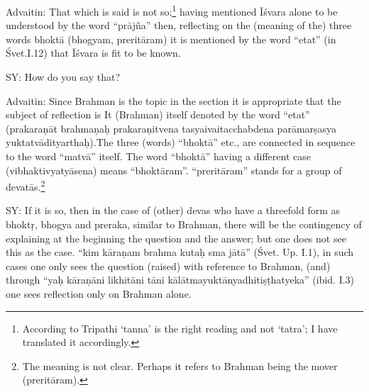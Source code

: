 \vskip 2pt

Advaitin: That which is said is not so;\footnote{According to Tripathi ‘tanna’ is the right reading and not ‘tatra’; I have translated it accordingly.} having mentioned Īśvara alone to be understood by the word “prājña” then, reflecting on the (meaning of the) three words bhoktā (bhogyam, preritāram) it is mentioned by the word “etat” (in Śvet.I.12) that Īśvara is fit to be known. 

\vskip 2pt

SY: How do you say that? 
 
\vskip 2pt

Advaitin: Since Brahman is the topic in the section it is appropriate that the subject of reflection is It (Brahman) itself  denoted by the word “etat” (prakaraṇāt brahmaṇaḥ prakaraṇitvena tasyaivaitacchabdena parāmarṣasya yuktatvādityarthaḥ).The three (words)  “bhoktā” etc., are connected in sequence to  the word “matvā” itself. The word “bhoktā” having a different case (vibhaktivyatyāsena) means “bhoktāram”. “preritāram” stands for a group of devatās.\footnote{The meaning is not clear. Perhaps it refers to Brahman being the mover (preritāram).}

\vskip 2pt

\textbf{}


\newpage



SY: If it is so, then in the case of (other) devas who have a threefold  form as bhoktṛ, bhogya and preraka, similar to Brahman, there will be the contingency of explaining at the beginning the question and the answer; but one does not see this as the case. “kim kāraṇam brahma kutaḥ sma jātā” (Śvet. Up. I.1), in such cases one only sees the question (raised) with reference to Brahman, (and) through “yaḥ kāraṇāni likhitāni tāni kālātmayuktānyadhitiṣṭhatyeka” (ibid. I.3) one sees reflection only on Brahman alone. 

